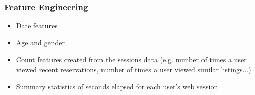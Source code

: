 \documentclass{beamer}
\begin{document}

\begin{frame}
\frametitle{Feature Engineering}
\begin{itemize}
  \item Date features
  \item Age and gender
  \item Count features created from the sessions data (e.g. number of times a user viewed recent reservations, number of times a user viewed similar listings...)
  \item Summary statistics of seconds elapsed for each user’s web session
\end{itemize}
\end{frame}

\end{document}
